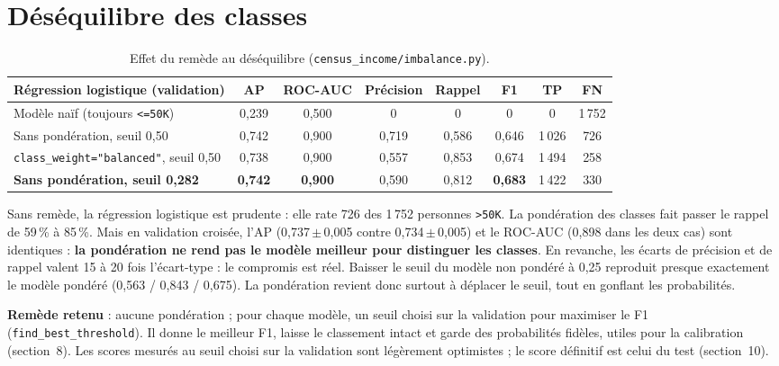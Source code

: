 \documentclass[11pt,a4paper]{article}
\begin{document}
\section{Déséquilibre des classes}

\begin{table}[H]
\centering\small
\begin{tabular}{lccccccc}
\toprule
Régression logistique (validation) & AP & ROC-AUC & Précision & Rappel & F1 & TP & FN \\
\midrule
Modèle naïf (toujours \texttt{<=50K}) & 0,239 & 0,500 & 0 & 0 & 0 & 0 & 1\,752 \\
Sans pondération, seuil 0,50 & 0,742 & 0,900 & 0,719 & 0,586 & 0,646 & 1\,026 & 726 \\
\texttt{class\_weight="balanced"}, seuil 0,50 & 0,738 & 0,900 & 0,557 & 0,853 & 0,674 & 1\,494 & 258 \\
\textbf{Sans pondération, seuil 0,282} & \textbf{0,742} & \textbf{0,900} & 0,590 & 0,812 & \textbf{0,683} & 1\,422 & 330 \\
\bottomrule
\end{tabular}
\caption{Effet du remède au déséquilibre (\texttt{census\_income/imbalance.py}).}
\label{tab:imbalance}
\end{table}

Sans remède, la régression logistique est prudente : elle rate 726 des 1\,752 personnes \texttt{>50K}. La pondération des classes fait passer le rappel de 59\,\% à 85\,\%. Mais en validation croisée, l'AP (0,737\,$\pm$\,0,005 contre 0,734\,$\pm$\,0,005) et le ROC-AUC (0,898 dans les deux cas) sont identiques : \textbf{la pondération ne rend pas le modèle meilleur pour distinguer les classes}. En revanche, les écarts de précision et de rappel valent 15 à 20 fois l'écart-type : le compromis est réel. Baisser le seuil du modèle non pondéré à 0,25 reproduit presque exactement le modèle pondéré (0,563 / 0,843 / 0,675). La pondération revient donc surtout à déplacer le seuil, tout en gonflant les probabilités.

\textbf{Remède retenu} : aucune pondération ; pour chaque modèle, un seuil choisi sur la validation pour maximiser le F1 (\texttt{find\_best\_threshold}). Il donne le meilleur F1, laisse le classement intact et garde des probabilités fidèles, utiles pour la calibration (section~8). Les scores mesurés au seuil choisi sur la validation sont légèrement optimistes ; le score définitif est celui du test (section~10).
\end{document}
